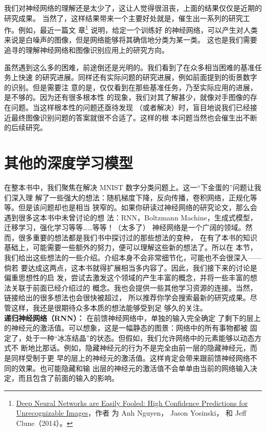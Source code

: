 我们对神经网络的理解还是太少了，这让人觉得很沮丧，上面的结果仅仅是近期的研究成果。
当然了，这样结果带来一个主要好处就是，催生出一系列的研究工作。例如，最近一篇文
章\footnote{\href{http://arxiv.org/abs/1412.1897}{Deep Neural Networks are
    Easily Fooled: High Confidence Predictions for Unrecognizable Images}，作者
  为 Anh Nguyen， Jason Yosinski， 和 Jeff Clune（2014）。} 说明，给定一个训练好
的神经网络，可以产生对人类来说是白噪声的图像，但是网络能够将其确信地分类为某一类。
这也是我们需要追寻的理解神经网络和图像识别应用上的研究方向。

虽然遇到这么多的困难，前途倒还是光明的。我们看到了在众多相当困难的基准任务上快速
的研究进展。同样还有实际问题的研究进展，例如前面提到的街景数字的识别。但是需要注
意的是，仅仅看到在那些基准任务，乃至实际应用的进展，是不够的。因为还有很多根本性
的现象，我们对其了解甚少，就像对手图像的存在问题。当这样根本性的问题还亟待发现
（或者解决）时，盲目地说我们已经接近最终图像识别问题的答案就很不合适了。这样的根
本问题当然也会催生出不断的后续研究。

\section{其他的深度学习模型}
\label{sec:other_approaches_to_deep_neural_nets}

在整本书中，我们聚焦在解决 MNIST 数字分类问题上。这一“下金蛋的”问题让我们深入理
解了一些强大的想法：随机梯度下降，反向传播，卷积网络，正规化等等。但是该问题却也是相当
狭窄的。如果你研读过神经网络的研究论文，那么会遇到很多这本书中未曾讨论的想
法：RNN，Boltzmann Machine，生成式模型，迁移学习，强化学习等等……等等！（太多了）
神经网络是一个广阔的领域。然而，很多重要的想法都是我们书中探讨过的那些想法的变种，
在有了本书的知识基础上，可能需要一些额外的努力，便可以理解这些新的想法了。所以在
本节，我们给出这些想法的一些介绍。介绍本身不会非常细节化，可能也不会很深入——倘若
要达成这两点，这本书就得扩展相当多内容了。因此，我们接下来的讨论是偏重思想性的启
发，尝试去激发这个领域的产生丰富的概念，并将一些丰富的想法关联于前面已经介绍过的
概念。我也会提供一些其他学习资源的连接。当然，链接给出的很多想法也会很快被超过，
所以推荐你学会搜索最新的研究成果。尽管这样，我还是很期待众多本质的想法能够受到足
够久的关注。\\

\textbf{递归神经网络（RNN）：} 在前馈神经网络中，单独的输入完全确定
了剩下的层上的神经元的激活值。可以想象，这是一幅静态的图景：网络中的所有事物都被
固定了，处于一种“冰冻结晶”的状态。但假如，我们允许网络中的元素能够以动态方式不
断地比那话。例如，隐藏神经元的行为不是完全由前一层的隐藏神经元，而是同样受制于更
早的层上的神经元的激活值。这样肯定会带来跟前馈神经网络不同的效果。也可能隐藏和输
出层的神经元的激活值不会单单由当前的网络输入决定，而且包含了前面的输入的影响。


